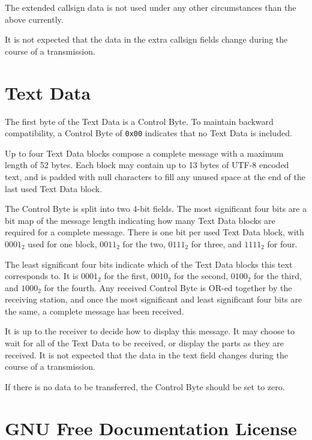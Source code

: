\documentclass[a4paper,11pt,oneside]{book}
\begin{document}
The extended callsign data is not used under any other circumstances than the above currently.

It is not expected that the data in the extra callsign fields change during the course of a transmission.

\chapter{Text Data} \label{text_data}

The first byte of the Text Data is a Control Byte. To maintain backward compatibility, a Control Byte of \texttt{0x00} indicates that no Text Data is included.

Up to four Text Data blocks compose a complete message with a maximum length of 52 bytes. Each block may contain up to 13 bytes of UTF-8 encoded text, and is padded with null characters to fill any unused space at the end of the last used Text Data block.

The Control Byte is split into two 4-bit fields. The most significant four bits are a bit map of the message length indicating how many Text Data blocks are required for a complete message. There is one bit per used Text Data block, with $0001_2$ used for one block, $0011_2$ for the two, $0111_2$ for three, and $1111_2$ for four.

The least significant four bits indicate which of the Text Data blocks this text corresponds to. It is $0001_2$ for the first, $0010_2$ for the second, $0100_2$ for the third, and $1000_2$ for the fourth. Any received Control Byte is OR-ed together by the receiving station, and once the most significant and least significant four bits are the same, a complete message has been received.

It is up to the receiver to decide how to display this message. It may choose to wait for all of the Text Data to be received, or display the parts as they are received. It is not expected that the data in the text field changes during the course of a transmission.

If there is no data to be transferred, the Control Byte should be set to zero.

\chapter{GNU Free Documentation License}
\end{document}
